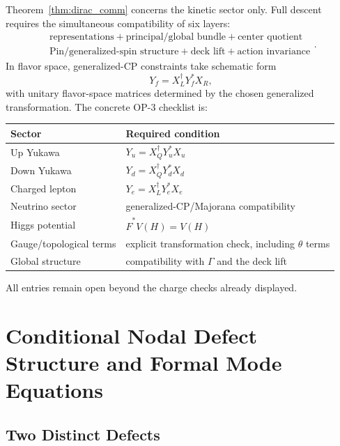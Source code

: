 \documentclass[11pt]{article}
\theoremstyle{canonmath}
\theoremstyle{canonpostulate}
\theoremstyle{canonclaim}
\begin{document}
Theorem~\ref{thm:dirac_comm} concerns the kinetic sector only. Full descent requires the simultaneous compatibility of six layers:
\begin{equation*}
\boxed{\begin{gathered}
\text{representations}+\text{principal/global bundle}+\text{center quotient}\\
\text{Pin/generalized-spin structure}+\text{deck lift}+\text{action invariance}
\end{gathered}}.
\end{equation*}
In flavor space, generalized-CP constraints take schematic form
\begin{equation}
Y_f=X_L^\dagger Y_f^*X_R,
\end{equation}
with unitary flavor-space matrices determined by the chosen generalized transformation. The concrete OP-3 checklist is:
\begin{center}
\begin{tabular}{@{}ll@{}}
\toprule
\textbf{Sector} & \textbf{Required condition} \\
\midrule
Up Yukawa & $Y_u=X_Q^\dagger Y_u^*X_u$ \\
Down Yukawa & $Y_d=X_Q^\dagger Y_d^*X_d$ \\
Charged lepton & $Y_e=X_L^\dagger Y_e^*X_e$ \\
Neutrino sector & generalized-CP/Majorana compatibility \\
Higgs potential & $\widehat F^*V(H)=V(H)$ \\
Gauge/topological terms & explicit transformation check, including $\theta$ terms \\
Global structure & compatibility with $\Gamma$ and the deck lift \\
\bottomrule
\end{tabular}
\end{center}
All entries remain open beyond the charge checks already displayed.

\section{Conditional Nodal Defect Structure and Formal Mode Equations}
\label{sec:wall}

\subsection{Two Distinct Defects}
\end{document}

